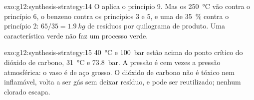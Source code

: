 \begin{solution}{exo:g12:synthesis-strategy:14}
O  aplica o princípio 9. Mas os \qty{250}{\celsius} vão
contra o princípio 6, o benzeno contra os princípios 3 e 5, e uma
 de \qty{35}{\percent} contra o princípio 2:
$65/35 = \qty{1.9}{kg}$ de resíduos por quilograma de produto. Uma
característica verde não faz um processo verde.
\end{solution}

\begin{solution}{exo:g12:synthesis-strategy:15}
\qty{40}{\celsius} e \qty{100}{bar} estão acima do ponto crítico do
dióxido de carbono, \qty{31}{\celsius} e \qty{73.8}{bar}. A pressão é
cem vezes a pressão atmosférica: o vaso é de aço grosso. O dióxido de
carbono não é tóxico nem inflamável, volta a ser gás sem deixar resíduo,
e pode ser reutilizado; nenhum  clorado escapa.
\end{solution}


